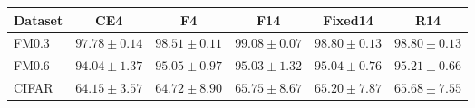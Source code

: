 \begin{tabular}{lccccc}
\toprule
Dataset & CE4 & F4 & F14 & Fixed14 & R14\\
\midrule
FM0.3 & $97.78\pm0.14$ & $98.51\pm0.11$ & $99.08\pm0.07$ & $98.80\pm0.13$ & $98.80\pm0.13$\\
FM0.6 & $94.04\pm1.37$ & $95.05\pm0.97$ & $95.03\pm1.32$ & $95.04\pm0.76$ & $95.21\pm0.66$\\
CIFAR & $64.15\pm3.57$ & $64.72\pm8.90$ & $65.75\pm8.67$ & $65.20\pm7.87$ & $65.68\pm7.55$\\
\bottomrule
\end{tabular}
